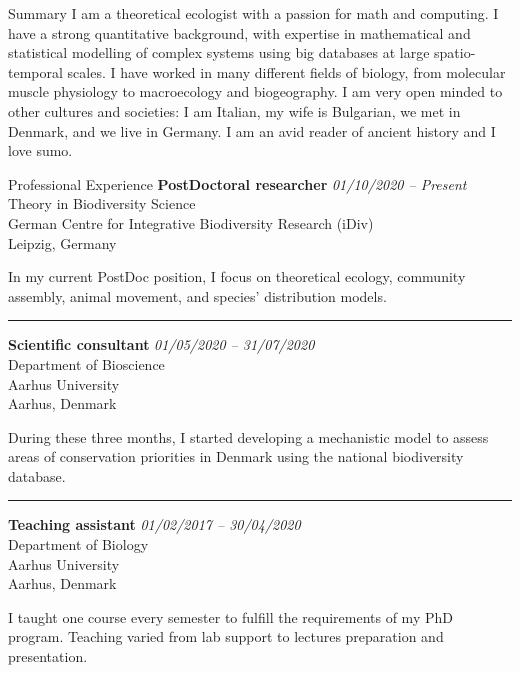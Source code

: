 \documentclass{resume} %
\newcommand{\spazio}{\begin{center} \par\noindent\rule{0.2\textwidth}{0.4pt} \end{center}}
\begin{document}
\begin{rSection}{Summary}
I am a theoretical ecologist with a passion for math and computing.
I have a strong quantitative background, with expertise in mathematical and statistical modelling of complex systems using big databases at large spatio-temporal scales.
I have worked in many different fields of biology, from molecular muscle physiology to macroecology and biogeography.
I am very open minded to other cultures and societies: I am Italian, my wife is Bulgarian, we met in Denmark, and we live in Germany.
I am an avid reader of ancient history and I love sumo.
\end{rSection}

\begin{rSection}{Professional Experience}
{\bf PostDoctoral researcher} \hfill {\em 01/10/2020 -- Present}\\
Theory in Biodiversity Science\\
German Centre for Integrative Biodiversity Research (iDiv)\\
Leipzig, Germany

In my current PostDoc position, I focus on theoretical ecology, community assembly, animal movement, and species' distribution models.

\spazio

{\bf Scientific consultant} \hfill {\em 01/05/2020 -- 31/07/2020}\\
Department of Bioscience\\
Aarhus University\\
Aarhus, Denmark

During these three months, I started developing a mechanistic model to assess areas of conservation priorities in Denmark using the national biodiversity database.

\spazio

{\bf Teaching assistant} \hfill {\em 01/02/2017 -- 30/04/2020}
\\Department of Biology\\
Aarhus University\\
Aarhus, Denmark

I taught one course every semester to fulfill the requirements of my PhD program. Teaching varied from lab support to lectures preparation and presentation.
\end{rSection}

\clearpage
\end{document}
